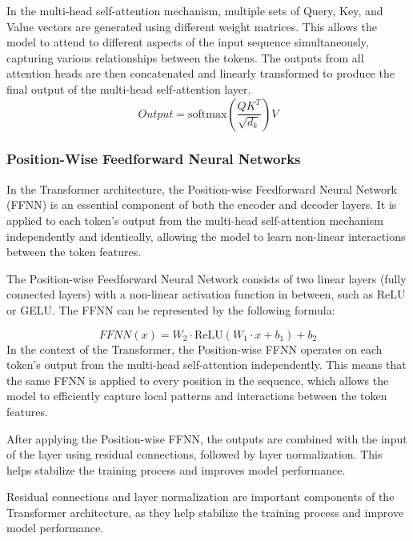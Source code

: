 \documentclass[12pt]{article}
\begin{document}
In the multi-head self-attention mechanism, multiple sets of Query, Key, and Value vectors are generated using different weight matrices. This allows the model to attend to different aspects of the input sequence simultaneously, capturing various relationships between the tokens. The outputs from all attention heads are then concatenated and linearly transformed to produce the final output of the multi-head self-attention layer.
$$Output = \text{softmax} \left( \frac{QK^T}{\sqrt{d_k}} \right) V $$
\subsubsection{Position-Wise Feedforward Neural Networks}
In the Transformer architecture, the Position-wise Feedforward Neural Network (FFNN) is an essential component of both the encoder and decoder layers. It is applied to each token's output from the multi-head self-attention mechanism independently and identically, allowing the model to learn non-linear interactions between the token features.

The Position-wise Feedforward Neural Network consists of two linear layers (fully connected layers) with a non-linear activation function in between, such as ReLU or GELU. The FFNN can be represented by the following formula:

$$ FFNN(x) = W_2 \cdot \text{ReLU}(W_1 \cdot x + b_1) + b_2 $$
In the context of the Transformer, the Position-wise FFNN operates on each token's output from the multi-head self-attention independently. This means that the same FFNN is applied to every position in the sequence, which allows the model to efficiently capture local patterns and interactions between the token features.

After applying the Position-wise FFNN, the outputs are combined with the input of the layer using residual connections, followed by layer normalization. This helps stabilize the training process and improves model performance.

Residual connections and layer normalization are important components of the Transformer architecture, as they help stabilize the training process and improve model performance.
\end{document}
